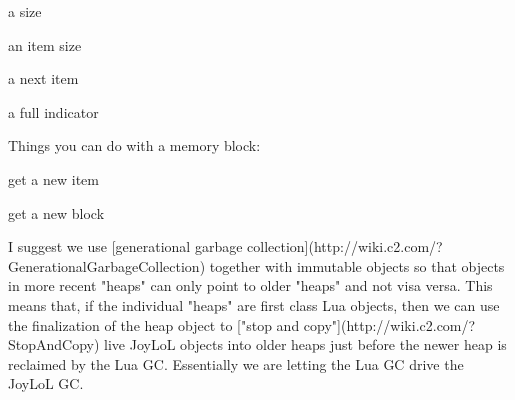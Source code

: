 \startitemize

\item a size

\item an item size

\item a next item

\item a full indicator

\stopitemize

Things you can do with a memory block:

\startitemize

\item get a new item

\item get a new block

\stopitemize


I suggest we use [generational garbage 
collection](http://wiki.c2.com/?GenerationalGarbageCollection) together 
with immutable objects so that objects in more recent "heaps" can only 
point to older "heaps" and not visa versa. This means that, if the 
individual "heaps" are first class Lua objects, then we can use the 
finalization of the heap object to ["stop and 
copy"](http://wiki.c2.com/?StopAndCopy) live JoyLoL objects into older 
heaps just before the newer heap is reclaimed by the Lua GC. Essentially 
we are letting the Lua GC drive the JoyLoL GC. 





